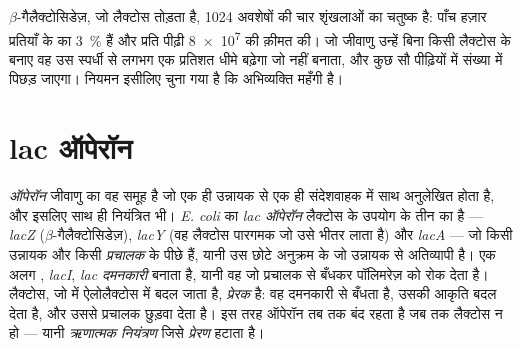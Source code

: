\begin{example}[एंजाइम केवल तभी बनाना जब चाहिए]\label{ex:b1:expression-control:economy}
 $\beta$-गैलैक्टोसिडेज़, जो लैक्टोस तोड़ता है, \qty{1024}{}
अवशेषों की चार शृंखलाओं का चतुष्क है: पाँच हज़ार प्रतियाँ  के
 का \qty{3}{\%} हैं और प्रति पीढ़ी \qty{8e7}{}  की क़ीमत की।
जो जीवाणु उन्हें बिना किसी लैक्टोस के बनाए वह उस स्पर्धी से लगभग एक
प्रतिशत धीमे बढ़ेगा जो नहीं बनाता, और कुछ सौ पीढ़ियों में संख्या में पिछड़
जाएगा। नियमन इसीलिए चुना गया है कि अभिव्यक्ति महँगी है।
\end{example}

\section{lac ऑपेरॉन}

\begin{definition}[ऑपेरॉन, दमनकारी, प्रचालक]\label{def:b1:expression-control:operon}
\emph{ऑपेरॉन} जीवाणु  का वह समूह है जो एक ही उन्नायक से एक ही
संदेशवाहक में साथ अनुलेखित होता है, और इसलिए साथ ही नियंत्रित भी। \emph{E. coli}
का \emph{lac ऑपेरॉन} लैक्टोस के उपयोग के तीन  का है
--- \emph{lacZ} ($\beta$-गैलैक्टोसिडेज़), \emph{lacY} (वह
लैक्टोस पारगमक जो उसे भीतर लाता है) और \emph{lacA} --- जो किसी
उन्नायक और किसी \emph{प्रचालक} के पीछे हैं, यानी उस छोटे अनुक्रम के जो
उन्नायक से अतिव्यापी है। एक अलग , \emph{lacI}, \emph{lac
दमनकारी} बनाता है, यानी वह  जो प्रचालक से बँधकर पॉलिमरेज़ को रोक
देता है। लैक्टोस, जो  में ऐलोलैक्टोस में बदल जाता है,
\emph{प्रेरक} है: वह दमनकारी से बँधता है, उसकी आकृति बदल देता है, और
उससे प्रचालक छुड़वा देता है। इस तरह ऑपेरॉन तब तक बंद रहता है जब तक
लैक्टोस न हो --- यानी \emph{ऋणात्मक नियंत्रण} जिसे \emph{प्रेरण} हटाता
है।
\end{definition}

